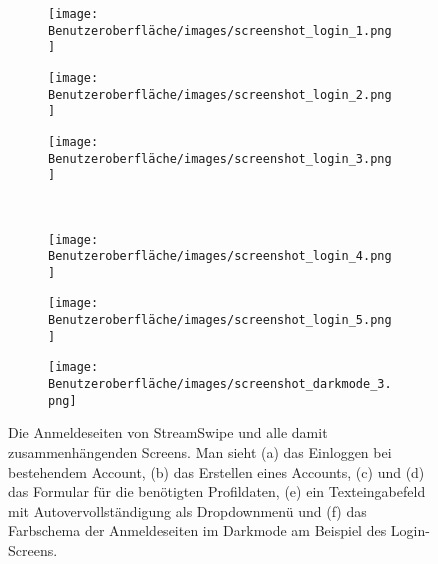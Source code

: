 \begin{figure}[H]
	\begin{subfigure}{0.33\textwidth}
	\centering
	\texttt{[image: Benutzeroberfläche/images/screenshot\_login\_1.png]}
	\caption{}
	\label{fig:login_a}
	\end{subfigure}
	\begin{subfigure}{0.33\textwidth}
	\centering
	\texttt{[image: Benutzeroberfläche/images/screenshot\_login\_2.png]}
	\caption{}
	\label{fig:login_b}
	\end{subfigure}
	\begin{subfigure}{0.33\textwidth}
	\centering
	\texttt{[image: Benutzeroberfläche/images/screenshot\_login\_3.png]}
	\caption{}
	\label{fig:login_c}
	\end{subfigure}\\ \vspace{1cm}	
	
	\begin{subfigure}{0.33\textwidth}
	\centering
	\texttt{[image: Benutzeroberfläche/images/screenshot\_login\_4.png]}
	\caption{}
	\label{fig:login_d}
	\end{subfigure}
	\begin{subfigure}{0.33\textwidth}
	\centering
	\texttt{[image: Benutzeroberfläche/images/screenshot\_login\_5.png]}
	\caption{}
	\label{fig:login_e}
	\end{subfigure}
	\begin{subfigure}{0.33\textwidth}
	\centering
	\texttt{[image: Benutzeroberfläche/images/screenshot\_darkmode\_3.png]}
	\caption{}
	\label{fig:login_f}
	\end{subfigure}
\caption[Screenshots der Anmeldeseiten]{Die Anmeldeseiten von StreamSwipe und alle damit zusammenhängenden Screens. Man sieht (a) das Einloggen bei bestehendem Account, (b) das Erstellen eines Accounts, (c) und (d) das Formular für die benötigten Profildaten, (e) ein Texteingabefeld mit Autovervollständigung als Dropdownmenü und (f) das Farbschema der Anmeldeseiten im Darkmode am Beispiel des Login-Screens.}
\label{fig:login_alle}
\end{figure}
